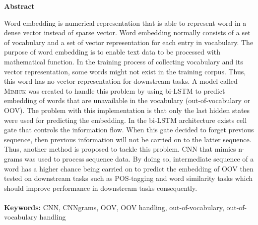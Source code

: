 \documentclass[a4paper,12pt]{report}
\newcommand{\linespacing}{1.5}
\renewcommand{\baselinestretch}{\linespacing}
\begin{document}





\newpage
{}
\tableofcontents

\newpage
\pagebreak
\hspace{0pt}
\vfill
\begin{center}
	\textbf{Abstract}
\end{center}
\par Word embedding is numerical representation that is able to
represent word in a dense vector instead of sparse vector. Word
embedding normally consists of a set of vocabulary and a set of vector
representation for each entry in vocabulary. The purpose of word
embedding is to enable text data to be processed with mathematical
function. In the training process of collecting vocabulary and its
vector representation, some words might not exist in the training
corpus. Thus, this word has no vector representation for downstream
tasks. A model called \textsc{Mimick} was created to handle this
problem by using bi-LSTM to predict embedding of words that are
unavailable in the vocabulary (out-of-vocabulary or OOV). The problem
with this implementation is that only the last hidden states were used
for predicting the embedding. In the bi-LSTM architecture exists cell
gate that controls the information flow. When this gate decided to
forget previous sequence, then previous information will not be
carried on to the latter sequence. Thus, another method is proposed to
tackle this problem. CNN that mimics n-grams was used to process
sequence data. By doing so, intermediate sequence of a word has a
higher chance being carried on to predict the embedding of OOV then
tested on downstream tasks such as POS-tagging and word similarity
tasks which should improve performance in downstream tasks
consequently. \\~\\
\textbf{Keywords:} CNN, CNNgrams, OOV, OOV handling,
out-of-vocabulary, out-of-vocabulary handling
\vfill
\hspace{0pt}
\pagebreak
\end{document}
